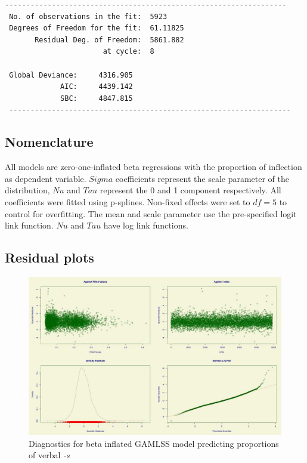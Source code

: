 \documentclass[
]{article}
\begin{document}
\begin{verbatim}
------------------------------------------------------------------ 
 No. of observations in the fit:  5923  
 Degrees of Freedom for the fit:  61.11825 
       Residual Deg. of Freedom:  5861.882  
                       at cycle:  8  
   
 Global Deviance:     4316.905  
             AIC:     4439.142  
             SBC:     4847.815  
 ------------------------------------------------------------------ 
\end{verbatim}

\normalsize
\newpage

\hypertarget{nomenclature}{%
\subsection{Nomenclature}\label{nomenclature}}

All models are zero-one-inflated beta regressions with the proportion of
inflection as dependent variable. \(Sigma\) coefficients represent the
scale parameter of the distribution, \(Nu\) and \(Tau\) represent the 0
and 1 component respectively. All coefficients were fitted using
p-splines. Non-fixed effects were set to \(df = 5\) to control for
overfitting. The mean and scale parameter use the pre-specified logit
link function. \(Nu\) and \(Tau\) have log link functions.

\hypertarget{diagnostics}{%
\subsection{Residual plots}\label{diagnostics}}

\begin{figure}
     \centering
     \includegraphics[width=\textwidth]{figures/m_verb_diagnostic.jpg}
     \caption{Diagnostics for beta inflated GAMLSS model predicting proportions of verbal \textit{-s}}
     \label{verb_diagnostics}
\end{figure}
\end{document}
